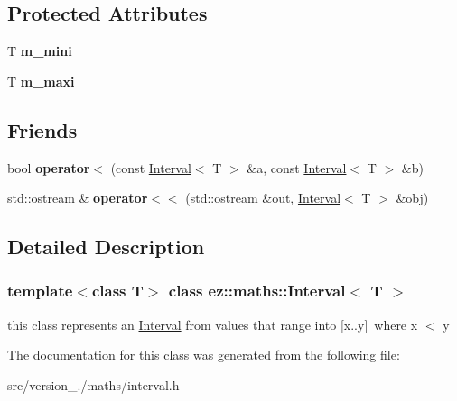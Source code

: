 \subsection*{Protected Attributes}
\begin{DoxyCompactItemize}
\item 
\mbox{\label{classez_1_1maths_1_1Interval_a019037c511314756bcba2b7cca453756}} 
T {\bfseries m\+\_\+mini}
\item 
\mbox{\label{classez_1_1maths_1_1Interval_ac22698e7c3be4ac4f2b4278f393470ef}} 
T {\bfseries m\+\_\+maxi}
\end{DoxyCompactItemize}
\subsection*{Friends}
\begin{DoxyCompactItemize}
\item 
\mbox{\label{classez_1_1maths_1_1Interval_a09cd95031ad758942e59a5de50ab51a2}} 
bool {\bfseries operator$<$} (const \hyperlink{classez_1_1maths_1_1Interval}{Interval}$<$ T $>$ \&a, const \hyperlink{classez_1_1maths_1_1Interval}{Interval}$<$ T $>$ \&b)
\item 
\mbox{\label{classez_1_1maths_1_1Interval_a22024bc002a0cc02281cbe6e648ed60c}} 
std\+::ostream \& {\bfseries operator$<$$<$} (std\+::ostream \&out, \hyperlink{classez_1_1maths_1_1Interval}{Interval}$<$ T $>$ \&obj)
\end{DoxyCompactItemize}


\subsection{Detailed Description}
\subsubsection*{template$<$class T$>$\newline
class ez\+::maths\+::\+Interval$<$ T $>$}

this class represents an \hyperlink{classez_1_1maths_1_1Interval}{Interval} from values that range into \mbox{[}x..y\mbox{]} where x $<$ y 

The documentation for this class was generated from the following file\+:\begin{DoxyCompactItemize}
\item 
src/version\+\_./maths/interval.\+h\end{DoxyCompactItemize}
